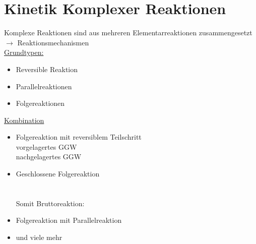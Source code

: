 \documentclass[a4paper, fleqn]{article}
\begin{document}
\section{Kinetik Komplexer Reaktionen}
Komplexe Reaktionen sind aus mehreren Elementarreaktionen zusammengesetzt $\rightarrow$ Reaktionsmechanismen\\
\underline{Grundtypen:}
\begin{itemize}
    \item Reversible Reaktion
    \item Parallelreaktionen
    \item Folgereaktionen
\end{itemize}
\underline{Kombination}
\begin{itemize}
    \item Folgereaktion mit reversiblem Teilschritt\\ vorgelagertes GGW \\nachgelagertes GGW 
    \item Geschlossene Folgereaktion\\\\\\Somit Bruttoreaktion: 
    \item Folgereaktion mit Parallelreaktion
    \item und viele mehr
\end{itemize}
\end{document}
